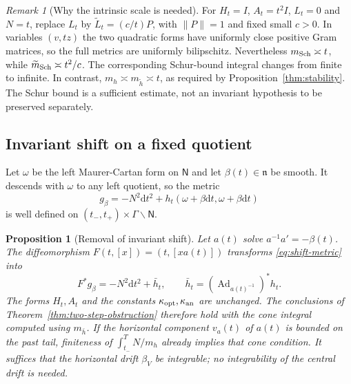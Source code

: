 \documentclass[10pt,a4paper]{article}
\numberwithin{equation}{section}
\newtheorem{proposition}[theorem]{Proposition}
\theoremstyle{definition}
\theoremstyle{remark}
\newtheorem{remark}[theorem]{Remark}
\newcommand{\dd}{\mathrm d}
\newcommand{\Ad}{\operatorname{Ad}}
\begin{document}
\begin{remark}[Why the intrinsic scale is needed]
For $H_t=I$, $A_t=t^2I$, $L_t=0$ and $N=t$, replace $L_t$ by
$\widetilde L_t=(c/t)P$, with $\|P\|=1$ and fixed small $c>0$.
In variables $(v,tz)$ the two quadratic forms have uniformly close
positive Gram matrices, so the full metrics are uniformly bilipschitz.
Nevertheless $m_{\rm Sch}\asymp t$, while
$\widetilde m_{\rm Sch}\asymp t^2/c$.
The corresponding Schur-bound integral changes from finite to infinite.
In contrast, $m_h\asymp m_{\widetilde h}\asymp t$, as required by
Proposition~\ref{thm:stability}.
The Schur bound is a sufficient estimate, not an invariant hypothesis
to be preserved separately.
\end{remark}

\subsection{Invariant shift on a fixed quotient}

Let $\omega$ be the left Maurer-Cartan form on $\mathsf N$ and let
$\beta(t)\in\mathfrak n$ be smooth.
It descends with $\omega$ to any left quotient, so the metric
\begin{equation}
 g_\beta=-N^2\dd t^2+h_t(\omega+\beta\dd t,\omega+\beta\dd t)
 \label{eq:shift-metric}
\end{equation}
is well defined on $(t_-,t_+)\times\Gamma\backslash\mathsf N$.

\begin{proposition}[Removal of invariant shift]
\label{prop:shift}
Let $a(t)$ solve $a^{-1}a'=-\beta(t)$.
The diffeomorphism $F(t,[x])=(t,[xa(t)])$ transforms
\eqref{eq:shift-metric} into
\[
 F^*g_\beta=-N^2\dd t^2+\bar h_t,\qquad
 \bar h_t=(\Ad_{a(t)^{-1}})^*h_t.
\]
The forms $H_t,A_t$ and the constants
$\kappa_{\rm opt},\kappa_{\rm an}$ are unchanged.
The conclusions of Theorem~\ref{thm:two-step-obstruction} therefore
hold with the cone integral computed using $m_{\bar h}$.
If the horizontal component $v_a(t)$ of $a(t)$ is bounded on the
past tail, finiteness of $\int_{t_-}^T N/m_h$ already implies that
cone condition.
It suffices that the horizontal drift $\beta_V$ be integrable;
no integrability of the central drift is needed.
\end{proposition}
\end{document}
